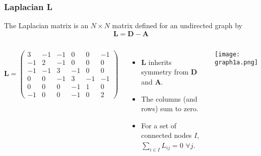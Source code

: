 \documentclass[10pt,aspectratio=169,dvipsnames]{beamer}
\let\olditem\item
\renewcommand{\item}{%
\olditem\vspace{5pt}}
\begin{document}
\begin{frame}
  \frametitle{Laplacian L}
  The \alert{Laplacian matrix} is an $N \times N$ matrix defined for an undirected graph by
\begin{equation*}
\mathbf{L} = \mathbf{D} - \mathbf{A}
\end{equation*}
\begin{columns}
\begin{equation*}
\mathbf{L}=\left(\begin{matrix}
3 & -1 & -1 & 0 & 0 & -1\\
-1 & 2 & -1 & 0 & 0 & 0\\
-1 & -1 & 3 & -1 & 0 & 0\\
0 & 0 & -1 & 3 & -1 & -1\\
0 & 0 & 0 & -1 & 1 & 0\\
-1 & 0 & 0 & -1 & 0 & 2
\end{matrix}\right)
\end{equation*}
\begin{itemize}
\item $\mathbf{L}$ inherits symmetry from $\mathbf{D}$ and $\mathbf{A}$.
\item The columns (and rows) sum to zero.
\item For a set of connected nodes $I$, $\sum_{i\in I} L_{ij} = 0$  $\forall j$.
\end{itemize}
\texttt{[image: graph1a.png]}
  \end{columns}
\end{frame}
\end{document}
